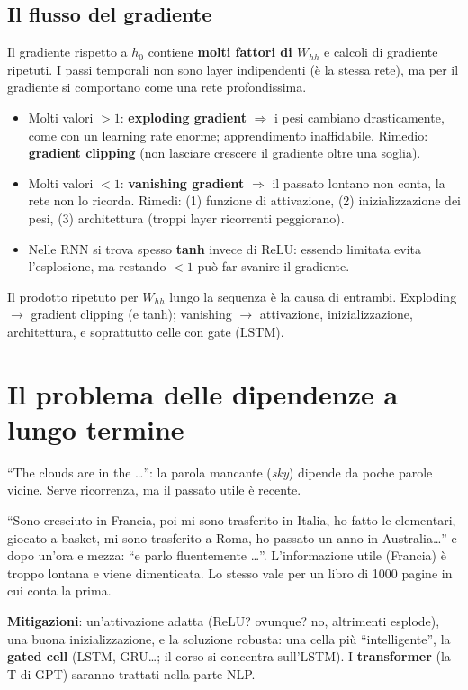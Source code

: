 \subsection{Il flusso del gradiente}
Il gradiente rispetto a $h_0$ contiene \textbf{molti fattori di $W_{hh}$} e calcoli di gradiente ripetuti. I passi temporali non
sono layer indipendenti (è la stessa rete), ma per il gradiente si comportano come una rete profondissima.
\begin{itemize}
  \item Molti valori $>1$: \textbf{exploding gradient} $\Rightarrow$ i pesi cambiano drasticamente, come con un learning rate enorme;
        apprendimento inaffidabile. Rimedio: \textbf{gradient clipping} (non lasciare crescere il gradiente oltre una soglia).
  \item Molti valori $<1$: \textbf{vanishing gradient} $\Rightarrow$ il passato lontano non conta, la rete non lo ricorda.
        Rimedi: (1) funzione di attivazione, (2) inizializzazione dei pesi, (3) architettura (troppi layer ricorrenti peggiorano).
  \item Nelle RNN si trova spesso \textbf{tanh} invece di ReLU: essendo limitata evita l'esplosione, ma restando $<1$ può far svanire il gradiente.
\end{itemize}
\begin{esame}
Il prodotto ripetuto per $W_{hh}$ lungo la sequenza è la causa di entrambi. Exploding $\to$ gradient clipping (e tanh);
vanishing $\to$ attivazione, inizializzazione, architettura, e soprattutto celle con gate (LSTM).
\end{esame}

\section{Il problema delle dipendenze a lungo termine}
\begin{esempio}
``The clouds are in the \ldots'': la parola mancante (\emph{sky}) dipende da poche parole vicine. Serve ricorrenza, ma il passato
utile è recente.

``Sono cresciuto in Francia, poi mi sono trasferito in Italia, ho fatto le elementari, giocato a basket, mi sono trasferito a Roma,
ho passato un anno in Australia\ldots'' e dopo un'ora e mezza: ``e parlo fluentemente \ldots''. L'informazione utile (Francia) è
troppo lontana e viene dimenticata. Lo stesso vale per un libro di 1000 pagine in cui conta la prima.
\end{esempio}
\textbf{Mitigazioni}: un'attivazione adatta (ReLU? ovunque? no, altrimenti esplode), una buona inizializzazione, e la soluzione
robusta: una cella più ``intelligente'', la \textbf{gated cell} (LSTM, GRU\ldots; il corso si concentra sull'LSTM). I
\textbf{transformer} (la T di GPT) saranno trattati nella parte NLP.

